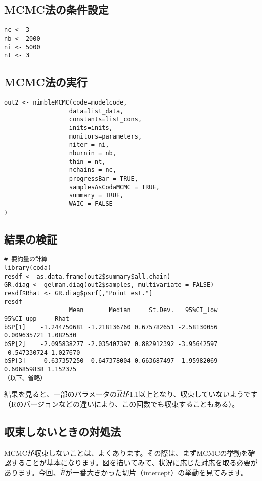 	\subsection{MCMC法の条件設定}
\begin{verbatim}
nc <- 3
nb <- 2000
ni <- 5000
nt <- 3
\end{verbatim}

\subsection{MCMC法の実行}
\begin{verbatim}
out2 <- nimbleMCMC(code=modelcode,
                  data=list_data,
                  constants=list_cons,
                  inits=inits,
                  monitors=parameters,
                  niter = ni,
                  nburnin = nb,
                  thin = nt,
                  nchains = nc,
                  progressBar = TRUE,
                  samplesAsCodaMCMC = TRUE,
                  summary = TRUE,
                  WAIC = FALSE
)
\end{verbatim}

\subsection{結果の検証}
\begin{verbatim}
# 要約量の計算
library(coda)
resdf <- as.data.frame(out2$summary$all.chain)
GR.diag <- gelman.diag(out2$samples, multivariate = FALSE)
resdf$Rhat <- GR.diag$psrf[,"Point est."]
resdf
                  Mean       Median     St.Dev.   95%CI_low    95%CI_upp     Rhat
bSP[1]    -1.244750681 -1.218136760 0.675782651 -2.58130056  0.009635721 1.082530
bSP[2]    -2.095838277 -2.035407397 0.882912392 -3.95642597 -0.547330724 1.027670
bSP[3]    -0.637357250 -0.647378004 0.663687497 -1.95982069  0.606859838 1.152375
（以下、省略）
\end{verbatim}
結果を見ると、一部のパラメータの$\hat{R}$が1.1以上となり、収束していないようです（Rのバージョンなどの違いにより、この回数でも収束することもある）。

\subsection{収束しないときの対処法}
MCMCが収束しないことは、よくあります。その際は、まずMCMCの挙動を確認することが基本になります。図を描いてみて、状況に応じた対応を取る必要があります。今回、$\hat{R}$が一番大きかった切片（intercept）の挙動を見てみます。

